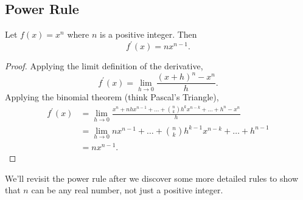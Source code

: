 \subsection{Power Rule}
\begin{lemma}
	Let $f(x) = x^n$ where $n$ is a positive integer. Then
	\begin{equation}
		f^\prime(x) = nx^{n-1}.
	\end{equation}
\end{lemma}
\begin{proof}
	Applying the limit definition of the derivative,
	\begin{equation*}
		f^\prime(x) = \lim_{h \to 0}{\frac{(x+h)^n - x^n}{h}}.
	\end{equation*}
	Applying the binomial theorem (think Pascal's Triangle),
	\begin{align*}
		f^\prime(x) &= \lim_{h \to 0}{\frac{x^n + nhx^{n-1} + \ldots + {n \choose k}h^{k}x^{n-k} + \ldots + h^n - x^n}{h}} \\
		&= \lim_{h \to 0}{nx^{n-1} + \ldots + {n \choose k}h^{k-1}x^{n-k} + \ldots + h^{n-1}} \\
		&= nx^{n-1}.
	\end{align*}
\end{proof}
\noindent
We'll revisit the power rule after we discover some more detailed rules to show that $n$ can be any real number, not just a positive integer.